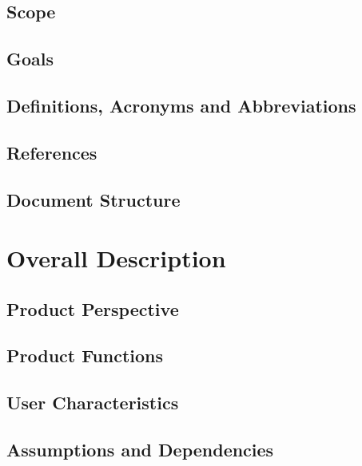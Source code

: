 \documentclass[a4paper,12pt]{report}
\begin{document}
	\section{Scope}
	

	\section{Goals}
	

	\section{Definitions, Acronyms and Abbreviations}
	

	\section{References}

	\section{Document Structure}

	\chapter{Overall Description}
	\label{ch:Overall_Description}

	\section{Product Perspective}
	

	\section{Product Functions}

	\section{User Characteristics}
	

	\section{Assumptions and Dependencies}
	
\end{document}
